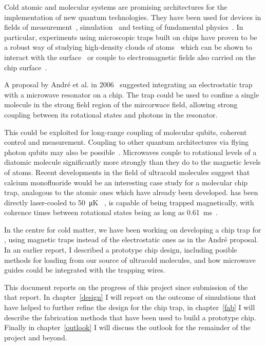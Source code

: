Cold atomic and molecular systems are promising architectures for the
implementation of new quantum technologies. They have been used for devices in
fields of measurement~\cite{PhysRevLett.120.103201}, simulation~\cite{Gross995}
and testing of fundamental physics~\cite{DeMille990}.  In particular,
experiments using microscopic traps built on chips have proven to be a robust
way of studying high-density clouds of atoms~\cite{Reichel1999, Ott2001} which
can be shown to interact with the surface~\cite{FOLMAN2002263} or couple to electromagnetic
fields also carried on the chip surface~\cite{Treutlein2008, Sewell_2010}.
%

A proposal by Andr\'e et al. in 2006~\cite{Andre2006} suggested integrating an
electrostatic trap with a microwave resonator on a chip. The trap could be used
to confine a single molecule in the strong field region of the mircorwace
field, allowing strong coupling between its rotational states and photons in
the resonator.


This could be exploited for long-range coupling of molecular
qubits, coherent control and measurement. Coupling to other quantum
architectures via flying photon qubits may also be
possible~\cite{PhysRevLett.92.063601}.
Microwaves couple to rotational levels of a diatomic molecule
significantly more strongly than they do to the magnetic levels of atoms.
Recent developments in the field of ultracold molecules suggest that calcium
monofluoride would be an interesting case study for a molecular chip trap,
analogous to the atomic ones which have already been developed. \CaF{} has been
directly laser-cooled to \SI{50}{\micro\kelvin} ~\cite{Truppe2017}, is capable of being
trapped magnetically, with cohrence times between rotational states
being as long as
\SI{0.61}{\milli\second}~\cite{Blackmore_2018}. 

In the centre for cold matter, we have been working on developing a chip trap
for \CaF{}, using magnetic traps instead of the electrostatic ones as in the
Andr\'e proposal. In an earlier report, I described a prototype chip design,
including posible methods for loading from our source of ultracold molecules,
and how microwave guides could be integrated with the trapping wires.

This document reports on the progress of this project since submission of the
that report.  In chapter~\ref{design} I will report on the outcome of
simulations that have helped to further refine the design for the chip trap, in
chapter~\ref{fab} I will describe the fabrication methods that have been used
to build a prototype chip. Finally in chapter~\ref{outlook} I will discuss the
outlook for the remainder of the project and beyond.

